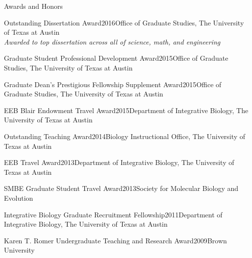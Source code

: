 \documentclass{resume} %
\begin{document}
\vspace*{0.35cm}
\begin{rSection}{Awards and Honors}
\vspace*{0.25cm}


\begin{rSubsection}{Outstanding Dissertation Award}{2016}{Office of Graduate Studies, The University of Texas at Austin \\ \emph{\footnotesize{Awarded to top dissertation across all of science, math, and engineering}}}{}
\end{rSubsection}

\begin{rSubsection}{Graduate Student Professional Development Award}{2015}{Office of Graduate Studies, The University of Texas at Austin}{}
\end{rSubsection}

\begin{rSubsection}{Graduate Dean's Prestigious Fellowship Supplement Award}{2015}{Office of Graduate Studies, The University of Texas at Austin}{}
\end{rSubsection}

\begin{rSubsection}{EEB Blair Endowment Travel Award}{2015}{Department of Integrative Biology, The University of Texas at Austin}{}
\end{rSubsection}

\begin{rSubsection}{Outstanding Teaching Award}{2014}{Biology Instructional Office, The University of Texas at Austin}{}
\end{rSubsection}

\begin{rSubsection}{EEB Travel Award}{2013}{Department of Integrative Biology, The University of Texas at Austin}{}
\end{rSubsection}

\begin{rSubsection}{SMBE Graduate Student Travel Award}{2013}{Society for Molecular Biology and Evolution}{}
\end{rSubsection}

\begin{rSubsection}{Integrative Biology Graduate Recruitment Fellowship}{2011}{Department of Integrative Biology, The University of Texas at Austin}{}
\end{rSubsection}

\begin{rSubsection}{Karen T. Romer Undergraduate Teaching and Research Award}{2009}{Brown University}{}
\end{rSubsection}


\end{rSection}
\end{document}

